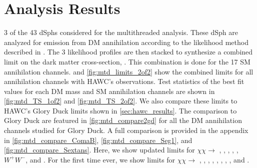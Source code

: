 \section{Analysis Results}\label{sec:mtd_results}

3 of the 43 \LS dSphs considered for the multithreaded analysis.
These dSph are analyzed for emission from DM annihilation according to the likelihood method described in .
The 3 likelihood profiles are then stacked to synthesize a combined limit on the dark matter cross-section, \sv.
This combination is done for the 17 SM annihilation channels.
 and \cref{fig:mtd_limits_2of2} show the combined limits for all annihilation channels with HAWC's observations.
Test statistics of the best fit \sv values for each DM mass and SM annihilation channels are shown in \cref{fig:mtd_TS_1of2} and \cref{fig:mtd_TS_2of2}.
We also compare these limits to HAWC's Glory Duck limits shown in \cref{sec:hawc_results}.
The comparison to Glory Duck are featured in \cref{fig:mtd_compare2gd} for all the DM annihilation channels studied for Glory Duck.
A full comparison is provided in the appendix in \cref{fig:mtd_compare_ComaB}, \cref{fig:mtd_compare_Seg1}, and \cref{fig:mtd_compare_Sextans}.
Here, we show updated limits for $\chi\chi \rightarrow$ , , \parpar{\mu}, \parpar{\tau}, , $W^+W^-$, \pp{\gamma} and .
For the first time ever, we show limits for $\chi\chi \rightarrow$ , , , , , \parpar{\nu_\mu}, \parpar{\nu_\tau}, , and .

